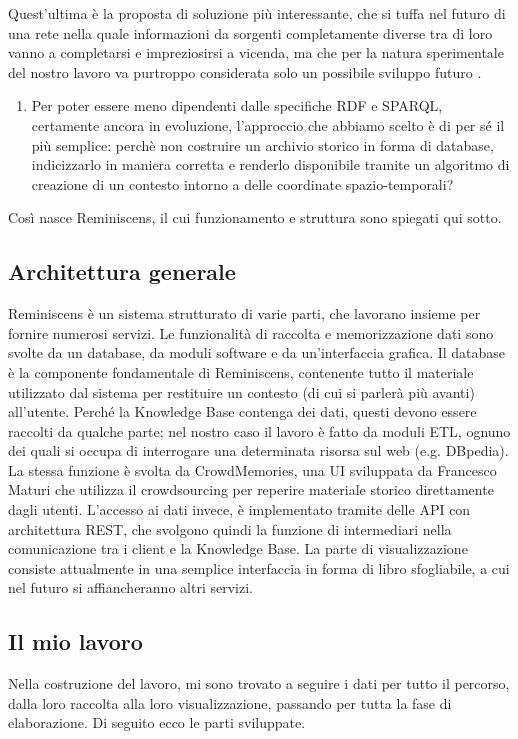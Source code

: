 \documentclass[sigproc-sp.tex]{subfiles}
\begin{document}
Quest’ultima è la proposta di soluzione più interessante, che si tuffa nel futuro di una rete nella quale informazioni da sorgenti completamente diverse tra di loro vanno a completarsi e impreziosirsi a vicenda, ma che per la natura sperimentale del nostro lavoro va purtroppo considerata solo un possibile sviluppo futuro .

\begin{enumerate}[resume]
\item Per poter essere meno dipendenti dalle specifiche RDF e SPARQL, certamente ancora in evoluzione, l’approccio che abbiamo scelto è di per sé il più semplice: perchè non costruire un archivio storico in forma di database, indicizzarlo in maniera corretta e renderlo disponibile tramite un algoritmo di creazione di un contesto intorno a delle coordinate spazio-temporali?
\end{enumerate}

Così nasce Reminiscens, il cui funzionamento e struttura sono spiegati qui sotto.

\subsection{Architettura generale}
Reminiscens è un sistema strutturato di varie parti, che lavorano insieme per fornire numerosi servizi. Le funzionalità di raccolta e memorizzazione dati sono svolte da un database, da moduli software e da un’interfaccia grafica. Il database è la componente fondamentale di Reminiscens, contenente tutto il materiale utilizzato dal sistema per restituire un contesto (di cui si parlerà più avanti) all’utente. Perché la Knowledge Base contenga dei dati, questi devono essere raccolti da qualche parte; nel nostro caso il lavoro è fatto da moduli ETL, ognuno dei quali si occupa di interrogare una determinata risorsa sul web (e.g. DBpedia). La stessa funzione è svolta da CrowdMemories, una UI sviluppata da Francesco Maturi che utilizza il crowdsourcing per reperire materiale storico direttamente dagli utenti. L’accesso ai dati invece, è implementato tramite delle API con architettura REST, che svolgono quindi la funzione di intermediari nella comunicazione tra i client e la Knowledge Base. La parte di visualizzazione consiste attualmente in una semplice interfaccia in forma di libro sfogliabile, a cui nel futuro si affiancheranno altri servizi.

\subsection{Il mio lavoro}
Nella costruzione del lavoro, mi sono trovato a seguire i dati per tutto il percorso, dalla loro raccolta alla loro visualizzazione, passando per tutta la fase di elaborazione. Di seguito ecco le parti sviluppate.
\end{document}
